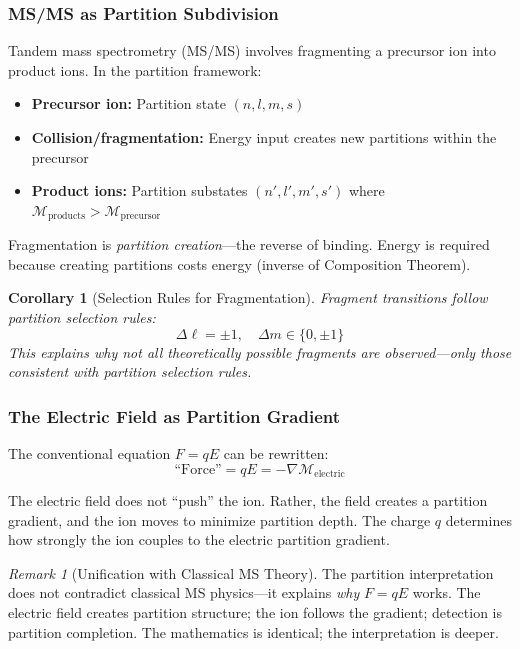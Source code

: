 \documentclass[twocolumn,10pt,a4paper]{article}
\newtheorem{corollary}[theorem]{Corollary}
\theoremstyle{definition}
\theoremstyle{remark}
\newtheorem{remark}[theorem]{Remark}
\newcommand{\Depth}{\mathcal{M}}
\begin{document}
\subsubsection{MS/MS as Partition Subdivision}

Tandem mass spectrometry (MS/MS) involves fragmenting a precursor ion into product ions. In the partition framework:

\begin{itemize}
    \item \textbf{Precursor ion:} Partition state $(n, l, m, s)$
    \item \textbf{Collision/fragmentation:} Energy input creates new partitions within the precursor
    \item \textbf{Product ions:} Partition substates $(n', l', m', s')$ where $\Depth_{\text{products}} > \Depth_{\text{precursor}}$
\end{itemize}

Fragmentation is \emph{partition creation}---the reverse of binding. Energy is required because creating partitions costs energy (inverse of Composition Theorem).

\begin{corollary}[Selection Rules for Fragmentation]
Fragment transitions follow partition selection rules:
\begin{equation}
    \Delta \ell = \pm 1, \quad \Delta m \in \{0, \pm 1\}
\end{equation}
This explains why not all theoretically possible fragments are observed---only those consistent with partition selection rules.
\end{corollary}

\subsubsection{The Electric Field as Partition Gradient}

The conventional equation $F = qE$ can be rewritten:
\begin{equation}
    \text{``Force''} = q E = -\nabla \Depth_{\text{electric}}
\end{equation}

The electric field does not ``push'' the ion. Rather, the field creates a partition gradient, and the ion moves to minimize partition depth. The charge $q$ determines how strongly the ion couples to the electric partition gradient.

\begin{remark}[Unification with Classical MS Theory]
The partition interpretation does not contradict classical MS physics---it explains \emph{why} $F = qE$ works. The electric field creates partition structure; the ion follows the gradient; detection is partition completion. The mathematics is identical; the interpretation is deeper.
\end{remark}
\end{document}
